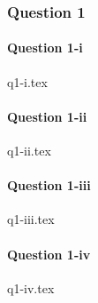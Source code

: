 \documentclass[crop=false,fleqn]{standalone}
\begin{document}
    \subsubsection{Question 1}

    \paragraph{Question 1-i}
    {q1-i.tex}

    \paragraph{Question 1-ii}
    {q1-ii.tex}

    \paragraph{Question 1-iii}
    {q1-iii.tex}

    \paragraph{Question 1-iv}
    {q1-iv.tex}
\end{document}
